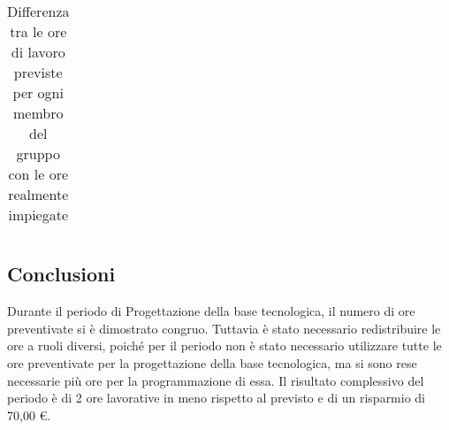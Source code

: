 \begin{flushleft}
\begin{table}[ht]
\begin{center}
\begin{tabularx}{\textwidth}{|c|cccccc|c|}
   	\end{tabularx}
  	\caption{Differenza tra le ore di lavoro previste per ogni membro del gruppo con le ore realmente impiegate }
\end{center}
\end{table}
  
  \subsection{Conclusioni}
  Durante il periodo di Progettazione della base tecnologica, il numero di ore preventivate si è dimostrato congruo. Tuttavia è stato necessario redistribuire le ore a ruoli diversi, poiché per il periodo non è stato necessario utilizzare tutte le ore preventivate per la progettazione della base tecnologica, ma si sono rese necessarie più ore per la programmazione di essa. 
  Il risultato complessivo del periodo è di 2 ore lavorative in meno rispetto al previsto e di un risparmio di 70,00 \euro.
  
   \end{flushleft}